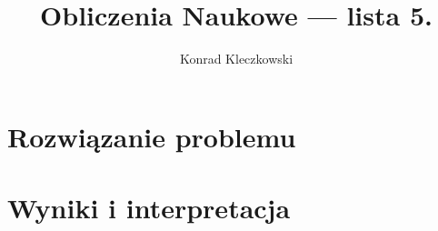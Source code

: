 \documentclass{mwrep}
\title{Obliczenia Naukowe --- lista 5.}
\author{Konrad Kleczkowski}
\begin{document}
  \maketitle
  \tableofcontents
  
  
  
  \chapter{Rozwiązanie problemu}
  \chapter{Wyniki i interpretacja} 


  \listofalgorithms
  \listoffigures
  \listoftables
  \printbibliography[title=Literatura]
\end{document}
